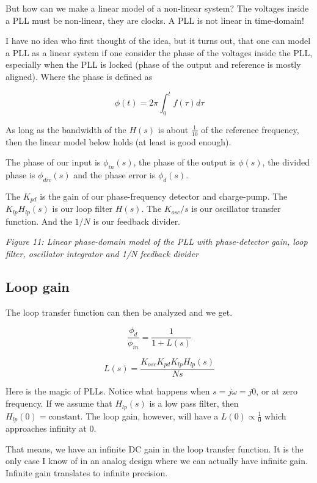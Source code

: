 But how can we make a linear model of a non-linear system? The voltages
inside a PLL must be non-linear, they are clocks. A PLL is not linear in
time-domain!

I have no idea who first thought of the idea, but it turns out, that one
can model a PLL as a linear system if one consider the phase of the
voltages inside the PLL, especially when the PLL is locked (phase of the
output and reference is mostly aligned). Where the phase is defined as

\[ \phi(t) = 2 \pi \int_0^t f(\tau) d\tau\]

As long as the bandwidth of the \(H(s)\) is about \(\frac{1}{10}\) of
the reference frequency, then the linear model below holds (at least is
good enough).

The phase of our input is \(\phi_{in}(s)\), the phase of the output is
\(\phi(s)\), the divided phase is \(\phi_{div}(s)\) and the phase error
is \(\phi_d(s)\).

The \(K_{pd}\) is the gain of our phase-frequency detector and
charge-pump. The \(K_{lp}H_{lp}(s)\) is our loop filter \(H(s)\). The
\(K_{osc}/s\) is our oscillator transfer function. And the \(1/N\) is
our feedback divider.


{
\centering
{}
}

\emph{Figure 11: Linear phase-domain model of the PLL with
phase-detector gain, loop filter, oscillator integrator and 1/N feedback
divider}

\subsection{Loop gain}\label{loop-gain}

The loop transfer function can then be analyzed and we get.

\[ \frac{\phi_d}{\phi_{in}} = \frac{1}{1 + L(s)}\]

\[ L(s) = \frac{ K_{osc} K_{pd} K_{lp} H_{lp}(s) }{N s} \]

Here is the magic of PLLs. Notice what happens when
\(s = j\omega = j 0\), or at zero frequency. If we assume that
\(H_{lp}(s)\) is a low pass filter, then
\(H_{lp}(0) = \text{constant}\). The loop gain, however, will have a
\(L(0) \propto \frac{1}{0}\) which approaches infinity at 0.

That means, we have an infinite DC gain in the loop transfer function.
It is the only case I know of in an analog design where we can actually
have infinite gain. Infinite gain translates to infinite precision.

